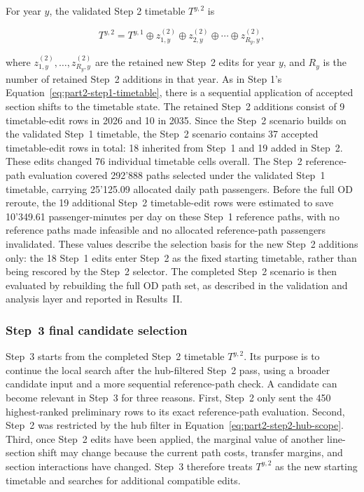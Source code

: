 \documentclass[preprint,12pt]{elsarticle}
\begin{document}
For year \(y\), the validated Step 2 timetable \(T^{y,2}\) is

\begin{equation}
T^{y,2}
=
T^{y,1}
\oplus
z^{(2)}_{1,y}
\oplus
z^{(2)}_{2,y}
\oplus
\cdots
\oplus
z^{(2)}_{R_y,y},
\label{eq:part2-step2-timetable}
\end{equation}

where \(z^{(2)}_{1,y},\ldots,z^{(2)}_{R_y,y}\) are the retained new Step~2 edits for year \(y\), and \(R_y\) is the number of retained Step~2 additions in that year. As in Step 1's Equation~\eqref{eq:part2-step1-timetable}, there is a sequential application of accepted section shifts to the timetable state. The retained Step~2 additions consist of 9 timetable-edit rows in 2026 and 10 in 2035. Since the Step~2 scenario builds on the validated Step~1 timetable, the Step~2 scenario contains 37 accepted timetable-edit rows in total: 18 inherited from Step~1 and 19 added in Step~2. These edits changed 76 individual timetable cells overall. The Step~2 reference-path evaluation covered 292'888 paths selected under the validated Step~1 timetable, carrying 25'125.09 allocated daily path passengers. Before the full OD reroute, the 19 additional Step~2 timetable-edit rows were estimated to save 10'349.61 passenger-minutes per day on these Step~1 reference paths, with no reference paths made infeasible and no allocated reference-path passengers invalidated. These values describe the selection basis for the new Step~2 additions only: the 18 Step~1 edits enter Step~2 as the fixed starting timetable, rather than being rescored by the Step~2 selector. The completed Step~2 scenario is then evaluated by rebuilding the full OD path set, as described in the validation and analysis layer and reported in Results~II.

\subsubsection{Step~3 final candidate selection}\label{sec:methods-part2-step3-search}
Step~3 starts from the completed Step~2 timetable \(T^{y,2}\). Its purpose is to continue the local search after the hub-filtered Step~2 pass, using a broader candidate input and a more sequential reference-path check. A candidate can become relevant in Step~3 for three reasons. First, Step~2 only sent the 450 highest-ranked preliminary rows to its exact reference-path evaluation. Second, Step~2 was restricted by the hub filter in Equation~\eqref{eq:part2-step2-hub-scope}. Third, once Step~2 edits have been applied, the marginal value of another line-section shift may change because the current path costs, transfer margins, and section interactions have changed. Step~3 therefore treats \(T^{y,2}\) as the new starting timetable and searches for additional compatible edits.
\end{document}
